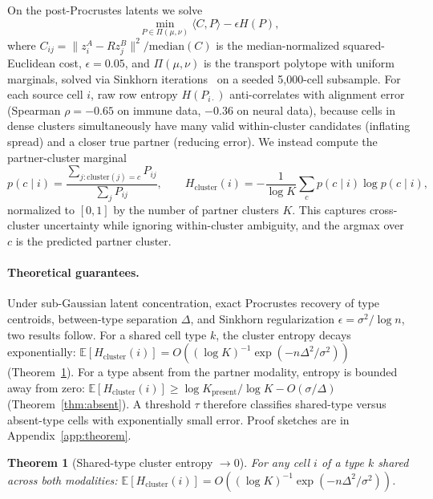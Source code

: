 \documentclass[pmlr]{jmlr}
\newtheorem{mainthm}{Theorem}
\newcommand{\Hcluster}{H_{\text{cluster}}}
\begin{document}
On the post-Procrustes latents we solve
\begin{equation}
\min_{P \in \Pi(\mu, \nu)} \langle C, P \rangle - \epsilon H(P),
\label{eq:sinkhorn}
\end{equation}
where $C_{ij} = \|z_i^A - R z_j^B\|^2 / \text{median}(C)$ is the median-normalized squared-Euclidean cost, $\epsilon = 0.05$, and $\Pi(\mu, \nu)$ is the transport polytope with uniform marginals, solved via Sinkhorn iterations~\citep{flamary2021pot} on a seeded 5{,}000-cell subsample. For each source cell $i$, raw row entropy $H(P_{i\cdot})$ anti-correlates with alignment error (Spearman $\rho = -0.65$ on immune data, $-0.36$ on neural data), because cells in dense clusters simultaneously have many valid within-cluster candidates (inflating spread) and a closer true partner (reducing error). We instead compute the partner-cluster marginal
\begin{equation}
p(c \mid i) = \frac{\sum_{j: \text{cluster}(j) = c} P_{ij}}{\sum_j P_{ij}}, \qquad \Hcluster(i) = -\frac{1}{\log K} \sum_c p(c \mid i) \log p(c \mid i),
\label{eq:hcluster}
\end{equation}
normalized to $[0,1]$ by the number of partner clusters $K$. This captures cross-cluster uncertainty while ignoring within-cluster ambiguity, and the argmax over $c$ is the predicted partner cluster.

\paragraph{Theoretical guarantees.} Under sub-Gaussian latent concentration, exact Procrustes recovery of type centroids, between-type separation $\Delta$, and Sinkhorn regularization $\epsilon = \sigma^2/\log n$, two results follow. For a shared cell type $k$, the cluster entropy decays exponentially: $\mathbb{E}[\Hcluster(i)] = O\!\left((\log K)^{-1} \exp(-n\Delta^2/\sigma^2)\right)$ (Theorem~\ref{thm:shared}). For a type absent from the partner modality, entropy is bounded away from zero: $\mathbb{E}[\Hcluster(i)] \geq \log K_{\text{present}} / \log K - O(\sigma/\Delta)$ (Theorem~\ref{thm:absent}). A threshold $\tau$ therefore classifies shared-type versus absent-type cells with exponentially small error. Proof sketches are in Appendix~\ref{app:theorem}.

\begin{mainthm}[Shared-type cluster entropy $\to 0$]
\label{thm:shared}
For any cell $i$ of a type $k$ shared across both modalities: $\mathbb{E}[\Hcluster(i)] = O\!\left((\log K)^{-1} \exp(-n \Delta^2 / \sigma^2)\right)$.
\end{mainthm}
\end{document}
